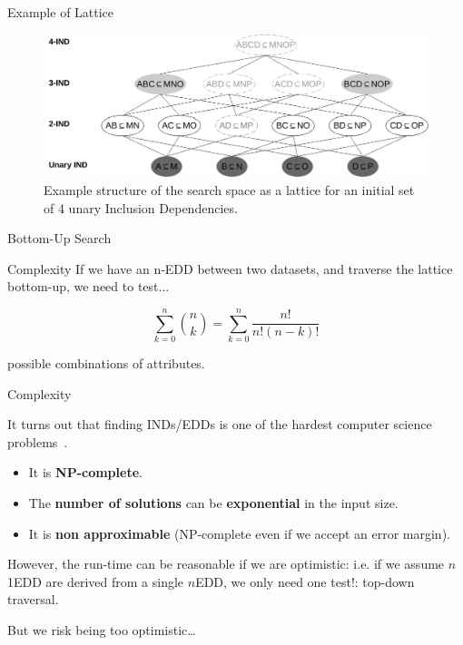 \documentclass[10pt]{beamer}
\begin{document}
\begin{frame}{Example of Lattice}
\begin{figure}
    \centering
    \includegraphics[width=\textwidth]{lattice.pdf}
    \caption{
    Example structure of the search space as a lattice for an initial set
    of 4 unary Inclusion Dependencies.
    }
\end{figure}
\end{frame}

\begin{frame}{Bottom-Up Search}
    \begin{alertblock}{Complexity}
    If we have an n-EDD between two datasets, and traverse the lattice bottom-up, we need
    to test...
    
    \begin{equation*}
        \sum_{k=0}^{n}{\binom{n}{k}} = \sum_{k=0}^{n} \frac{n!}{n!(n - k)!}
    \end{equation*}
    
    possible combinations of attributes.
    \end{alertblock}
\end{frame}

\begin{frame}{Complexity}

    It turns out that finding INDs/EDDs is one of the hardest computer science
    problems~\cite{Blsius2017}.
    
    \begin{itemize}
        \item It is \textbf{NP-complete}.
        \item The \textbf{number of solutions} can be \textbf{exponential} in the input size.
        \item It is \textbf{non approximable} (NP-complete even if we accept an error margin).
    \end{itemize}
    
    \bigskip
    
    However, the run-time can be reasonable if we are optimistic: i.e. if we assume
    $n$ 1EDD are derived from a single $n$EDD, we only need one test!: top-down traversal.
    
    \bigskip
    
    But we risk being too optimistic\ldots
\end{frame}
\end{document}
